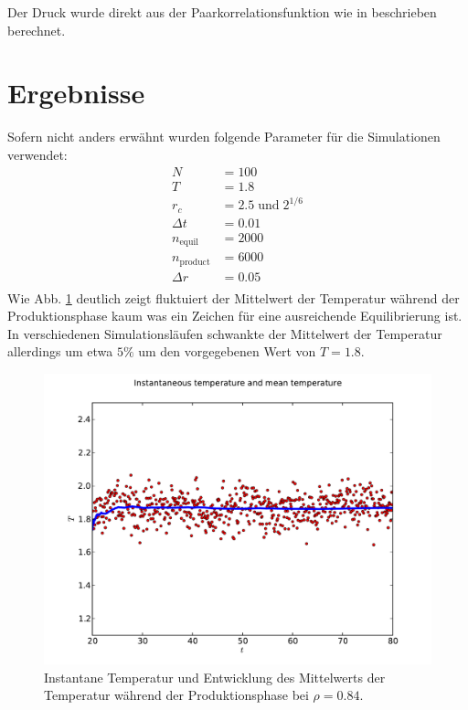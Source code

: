 \documentclass[11pt,a4paper]{article}
\newcommand{\ind}[1]{_{\mathrm{#1}}}
\begin{document}
Der Druck wurde direkt aus der Paarkorrelationsfunktion wie in \cite{sperandeo} beschrieben berechnet.

\section{Ergebnisse} %
\label{sec:ergebnisse}
Sofern nicht anders erwähnt wurden folgende Parameter für die Simulationen verwendet:
\begin{align*}
	N &= 100\\
	T &= 1.8\\
	r_c &= 2.5 \;\text{und}\; 2^{1/6}\\
	\Delta t &= 0.01\\
	n\ind{equil} &= 2000\\
	n\ind{product} &= 6000\\
	\Delta r &= 0.05\\
\end{align*}
Wie Abb. \ref{fig:T_Mean} deutlich zeigt fluktuiert der Mittelwert der Temperatur während der Produktionsphase kaum was ein Zeichen für eine ausreichende Equilibrierung ist. In verschiedenen Simulationsläufen schwankte der Mittelwert der Temperatur allerdings um etwa $5 \%$ um den vorgegebenen Wert von $T = 1.8$.
\begin{figure}[tbp]
 \centering
  \includegraphics[width=12cm]{../T_mean}
 \caption{Instantane Temperatur und Entwicklung des Mittelwerts der Temperatur während der Produktionsphase bei $\rho = 0.84$.}\label{fig:T_Mean}
\end{figure}
\end{document}
